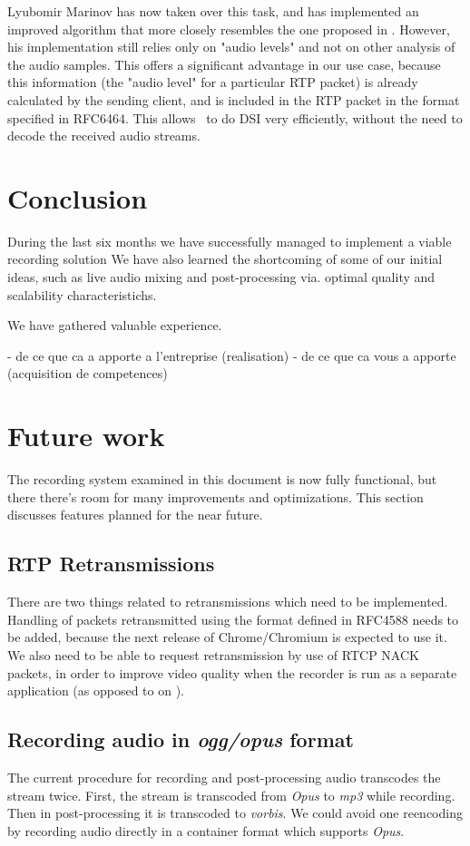 \documentclass[twoside,openright,a4paper,12pt,english]{article}
\begin{document}
Lyubomir Marinov has now taken over this task, and has implemented an improved algorithm that more closely resembles the
one proposed in \cite{volfin2012}. However, his implementation still relies only on
"audio levels" and not on other analysis of the audio samples. This offers a significant advantage
in our use case, because this information (the "audio level" for a particular RTP packet) is already
calculated by the sending client, and is included in the RTP packet in the format specified in RFC6464\cite{rfc6464}.
This allows \jvb\ to do DSI very efficiently, without the need to decode the received audio streams.



\section{Conclusion}
\label{conclusion}
During the last six months we have successfully managed to implement a viable recording solution 
We have also learned the shortcoming of some of our initial ideas, such as live audio mixing and post-processing via.
optimal quality and scalability characteristichs. 

We have gathered valuable experience.

- de ce que ca a apporte a l’entreprise (realisation)
- de ce que ca vous a apporte (acquisition de competences)

\section{Future work}
\label{future-work}
The recording system examined in this document is now fully functional,
but there there's room for many improvements and optimizations. This section
discusses features planned for the near future.

\subsection{RTP Retransmissions}
There are two things related to retransmissions which need to be implemented.
Handling of packets retransmitted using the format defined in RFC4588 needs to
be added, because the next release of Chrome/Chromium is expected to use it.
We also need to be able to request retransmission by use of RTCP NACK packets,
in order to improve video quality when the recorder is run as a separate
application (as opposed to on \jvb).

\subsection{Recording audio in \emph{ogg/opus} format}
\label{ogg-opus}
The current procedure for recording and post-processing audio transcodes the stream
twice. First, the stream is transcoded from \emph{Opus} to \emph{mp3} while recording.
Then in post-processing it is transcoded to \emph{vorbis}. We could avoid one reencoding
by recording audio directly in a container format which supports \emph{Opus}.
\end{document}
